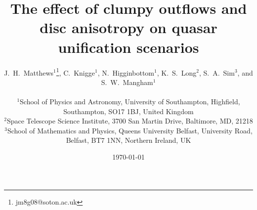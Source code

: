 \documentclass[useAMS,usenatbib]{mn2e_x}
\begin{document}


\def\py{\textsc{Python}}
\def\tar{\textsc{Tardis}}
\def\cld{\textsc{Cloudy}}
\def\agn{\textsc{Agnspec}}


\def\civ{C~\textsc{iv}}
\def\nv{N~\textsc{v}}
\def\hei{He~\textsc{i}}
\def\heii{He~\textsc{ii}}
\def\mg{Mg~\textsc{ii}}
\def\al{Al~\textsc{iii}}
\def\heii{He~\textsc{ii}}
\def\ovi{O~\textsc{vi}}
\def\la{Ly~$\alpha$}
\def\ha{H~$\alpha$}
\def\hb{H~$\beta$}



\def\araa{ARAA}
\def\nat{Nature}
\def\apjl{ApJ Letters}
\def\aapr{AAPR}
\def\ssr{SSR}
\def\apj{ApJ}
\def\pasp{PASP}
\def\aap{A\&A}
\def\mnras{MNRAS}
\def\aj{AJ}
\def\rmxaa{RMXAA}

%
%

\title
{
The effect of clumpy outflows
and disc anisotropy on quasar unification scenarios
}



\author[Matthews et al.]{
\parbox[t]{\textwidth}{
J.~H.~Matthews$^1$\thanks{jm8g08@soton.ac.uk}, C.~Knigge$^1$,
N.~Higginbottom$^1$, K.~S.~Long$^2$, S.~A.~Sim$^3$, and S.~W.~Mangham$^1$
}
\medskip  
\\$^1$School of Physics and Astronomy, University of Southampton, Highfield, Southampton, SO17 1BJ, United Kingdom
\\$^2$Space Telescope Science Institute, 3700 San Martin Drive, Baltimore, MD, 21218
\\$^3$School of Mathematics and Physics, Queens University Belfast, University Road, Belfast, BT7 1NN, Northern Ireland, UK
}

\date{\today}


%
%
\end{document}
